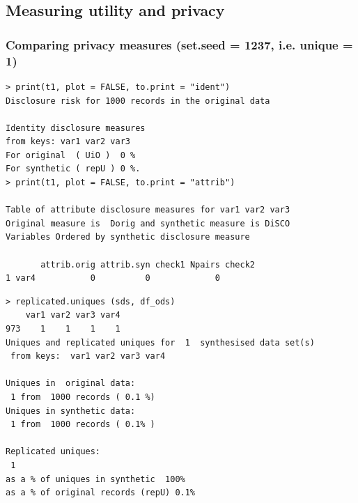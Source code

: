 \documentclass[t,8pt,utfx8]{beamer}
\begin{document}
\begin{spacing}{1.25}
\section{Measuring utility and privacy}\label{sec:measuring}


\begin{frame}[fragile]
\frametitle{Comparing privacy measures (set.seed = 1237, i.e. unique = 1)}
  


\begin{minipage}[t]{0.48\textwidth}
\begin{lstlisting}
> print(t1, plot = FALSE, to.print = "ident")
Disclosure risk for 1000 records in the original data

Identity disclosure measures
from keys: var1 var2 var3 
For original  ( UiO )  0 %
For synthetic ( repU ) 0 %.
> print(t1, plot = FALSE, to.print = "attrib")

Table of attribute disclosure measures for var1 var2 var3 
Original measure is  Dorig and synthetic measure is DiSCO 
Variables Ordered by synthetic disclosure measure

       attrib.orig attrib.syn check1 Npairs check2
1 var4           0          0             0       
\end{lstlisting}
\end{minipage}%
  \hfill%
\begin{minipage}[t]{0.48\textwidth}
\begin{lstlisting}
> replicated.uniques (sds, df_ods)
    var1 var2 var3 var4
973    1    1    1    1
Uniques and replicated uniques for  1  synthesised data set(s)
 from keys:  var1 var2 var3 var4 

Uniques in  original data:
 1 from  1000 records ( 0.1 %) 
Uniques in synthetic data:
 1 from  1000 records ( 0.1% )

Replicated uniques:
 1
as a % of uniques in synthetic  100%
as a % of original records (repU) 0.1%
\end{lstlisting}
\end{minipage}
\end{frame}


\end{spacing}
\end{document}
